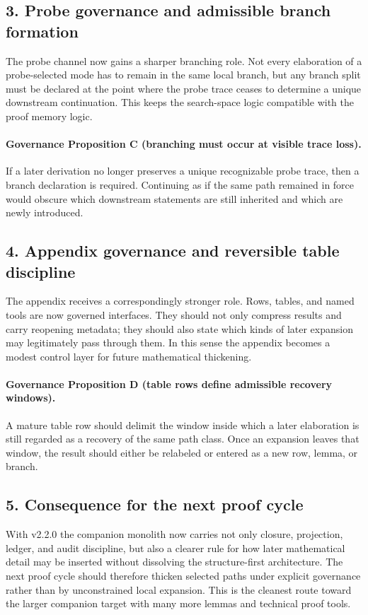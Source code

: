 \subsection*{3. Probe governance and admissible branch formation}
The probe channel now gains a sharper branching role. Not every elaboration of a
probe-selected mode has to remain in the same local branch, but any branch split
must be declared at the point where the probe trace ceases to determine a unique
downstream continuation. This keeps the search-space logic compatible with the
proof memory logic.

\paragraph{Governance Proposition C (branching must occur at visible trace loss).}
If a later derivation no longer preserves a unique recognizable probe trace,
then a branch declaration is required. Continuing as if the same path remained
in force would obscure which downstream statements are still inherited and which
are newly introduced.

\subsection*{4. Appendix governance and reversible table discipline}
The appendix receives a correspondingly stronger role. Rows, tables, and named
tools are now governed interfaces. They should not only compress results and
carry reopening metadata; they should also state which kinds of later expansion
may legitimately pass through them. In this sense the appendix becomes a modest
control layer for future mathematical thickening.

\paragraph{Governance Proposition D (table rows define admissible recovery windows).}
A mature table row should delimit the window inside which a later elaboration is
still regarded as a recovery of the same path class. Once an expansion leaves
that window, the result should either be relabeled or entered as a new row,
lemma, or branch.

\subsection*{5. Consequence for the next proof cycle}
With v2.2.0 the companion monolith now carries not only closure,
projection, ledger, and audit discipline, but also a clearer rule for how later
mathematical detail may be inserted without dissolving the structure-first
architecture. The next proof cycle should therefore thicken selected paths under
explicit governance rather than by unconstrained local expansion. This is the
cleanest route toward the larger companion target with many more lemmas and
technical proof tools.

